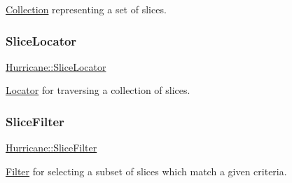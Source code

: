 \hyperlink{classHurricane_1_1Collection}{Collection} representing a set of slices. \mbox{\label{namespaceHurricane_a5c3b720aae3437342e9d6c57729dc895}} 
\subsubsection{\texorpdfstring{Slice\+Locator}{SliceLocator}}
{\footnotesize\ttfamily \hyperlink{namespaceHurricane_a5c3b720aae3437342e9d6c57729dc895}{Hurricane\+::\+Slice\+Locator}}

\hyperlink{classHurricane_1_1Locator}{Locator} for traversing a collection of slices. \mbox{\label{namespaceHurricane_a80703f9d02b235f3291fabbf53f86d4e}} 
\subsubsection{\texorpdfstring{Slice\+Filter}{SliceFilter}}
{\footnotesize\ttfamily \hyperlink{namespaceHurricane_a80703f9d02b235f3291fabbf53f86d4e}{Hurricane\+::\+Slice\+Filter}}

\hyperlink{classHurricane_1_1Filter}{Filter} for selecting a subset of slices which match a given criteria. 